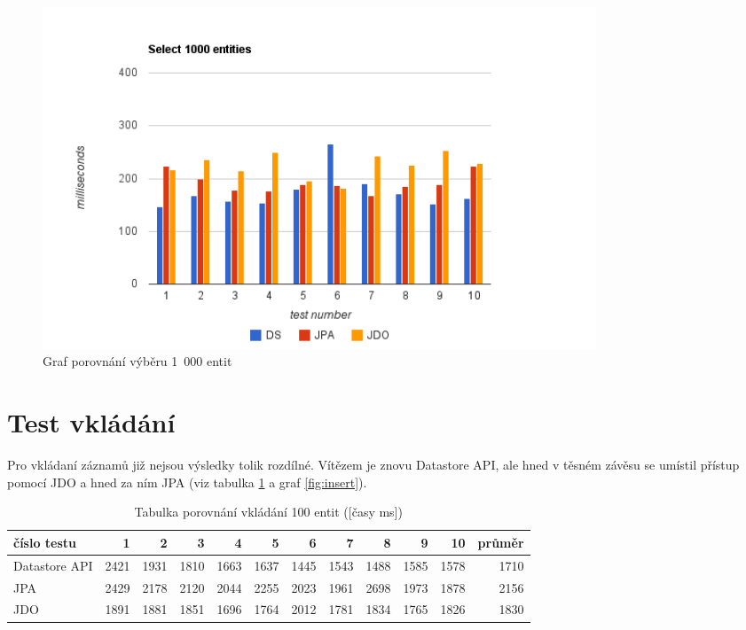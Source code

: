 \begin{figure}[h]
\begin{center}
\includegraphics[width=6.5in]{figures/select.png}
\caption{Graf porovnání výběru 1~000 entit}
\label{fig:select}
\end{center}
\end{figure}

\section{Test vkládání}
Pro vkládaní záznamů již nejsou výsledky tolik rozdílné. Vítězem je znovu Datastore API, ale hned v těsném závěsu se umístil přístup pomocí JDO a hned za ním JPA (viz tabulka \ref{tab:insert} a graf \ref{fig:insert}). 

\begin{table}[h]
\centering
\caption{Tabulka porovnání vkládání 100 entit ([časy ms])}\label{tab:insert}
\begin{tabular}{|l|r|r|r|r|r|r|r|r|r|r|r|}
   \hline
číslo testu	& 1		& 2		& 3		& 4		& 5		& 6		& 7		& 8		& 9		& 10		& průměr \\
   \hline
Datastore API	& 2421	& 1931	& 1810	& 1663	& 1637	& 1445	& 1543	& 1488	& 1585	& 1578	& 1710 \\
JPA	& 2429	& 2178	& 2120	& 2044	& 2255	& 2023	& 1961	& 2698	& 1973	& 1878	& 2156 \\
JDO	& 1891	& 1881	& 1851	& 1696	& 1764	& 2012	& 1781	& 1834	& 1765	& 1826	& 1830 \\
   \hline
\end{tabular}
\end{table}

